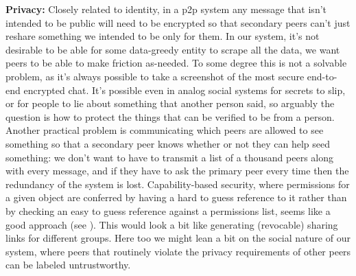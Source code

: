 \textbf{Privacy:} Closely related to identity, in a p2p system any
message that isn't intended to be public will need to be encrypted so
that secondary peers can't just reshare something we intended to be only
for them. In our system, it's not desirable to be able for some
data-greedy entity to scrape all the data, we want peers to be able to
make friction as-needed. To some degree this is not a solvable problem,
as it's always possible to take a screenshot of the most secure
end-to-end encrypted chat. It's possible even in analog social systems
for secrets to slip, or for people to lie about something that another
person said, so arguably the question is how to protect the things that
can be verified to be from a person. Another practical problem is
communicating which peers are allowed to see something so that a
secondary peer knows whether or not they can help seed something: we
don't want to have to transmit a list of a thousand peers along with
every message, and if they have to ask the primary peer every time then
the redundancy of the system is lost. Capability-based security, where
permissions for a given object are conferred by having a hard to guess
reference to it rather than by checking an easy to guess reference
against a permissions list, seems like a good approach (see \citep{conillWhatWouldActivityPub2019} ). This would look a bit like
generating (revocable) sharing links for different groups. Here too we
might lean a bit on the social nature of our system, where peers that
routinely violate the privacy requirements of other peers can be labeled
untrustworthy.

